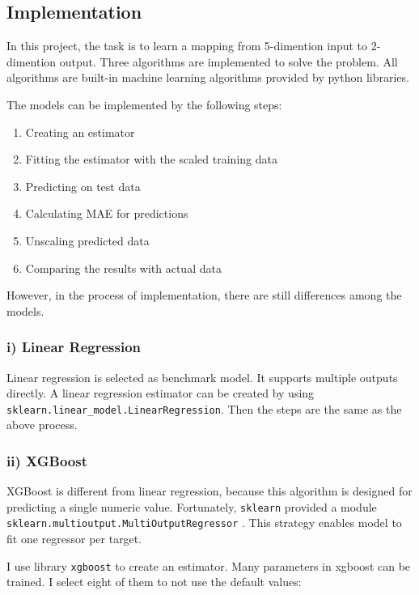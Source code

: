 \documentclass[a4paper,12pt]{article}
\begin{document}
\subsection*{Implementation}

In this project, the task is to learn a mapping from 5-dimention input to 2-dimention output. Three algorithms are implemented 
to solve the problem. All algorithms are built-in machine learning algorithms provided by python libraries.

The models can be implemented by the following steps: 

\begin{enumerate}[1)]

    \item Creating an estimator
    \item Fitting the estimator with the scaled training data
    \item Predicting on test data
    \item Calculating MAE for predictions
    \item Unscaling predicted data
    \item Comparing the results with actual data

\end{enumerate}

However, in the process of implementation, there are still differences among the models.

\subsubsection*{i) Linear Regression}

Linear regression is selected as benchmark model. It supports multiple outputs directly. A linear regression estimator can be 
created by using \\
\texttt{sklearn.linear\_model.LinearRegression}. Then the steps are the same as the above process.

\subsubsection*{ii) XGBoost}

XGBoost is different from linear regression, because this algorithm is designed for predicting a single numeric value. 
Fortunately, \texttt{sklearn} provided a module \texttt{sklearn.multioutput.MultiOutputRegressor} . This strategy enables model 
to fit one regressor per target. 

I use library \texttt{xgboost} to create an estimator. Many parameters in xgboost can be trained. I select eight of them to not 
use the default values:
\end{document}
